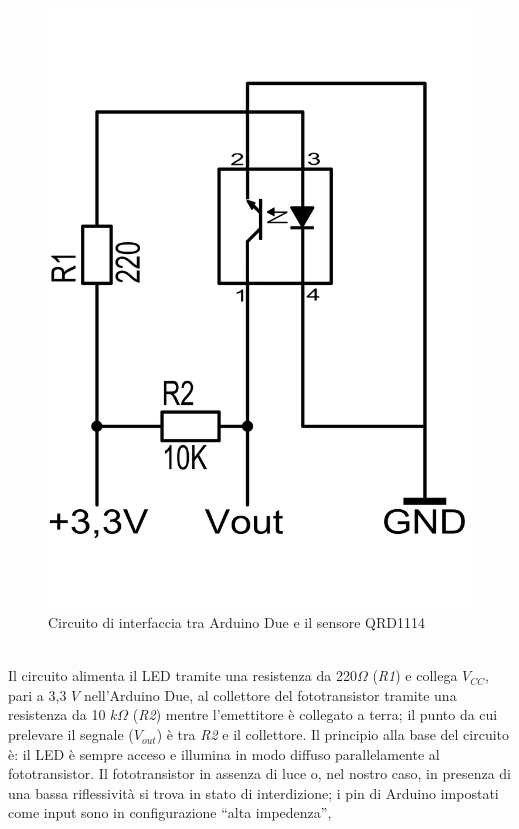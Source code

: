 \begin{figure}[!htb] \center
\includegraphics[scale=0.3]{immagini/QRD1114_Circuito.png}
\caption{Circuito di interfaccia tra Arduino Due e il sensore QRD1114} 
\end{figure}
\\Il circuito alimenta il LED tramite una resistenza da 220$\Omega$ (\textit{R1}) 
e collega $V_{CC}$, pari a 3,3 $V$ nell'Arduino Due, al collettore del 
fototransistor tramite una resistenza da 10 $k\Omega$ (\textit{R2}) mentre 
l'emettitore è collegato a terra; il punto da cui prelevare il segnale ($V_{out
}$) è tra \textit{R2} e il collettore. Il principio alla base del circuito è: 
il LED è sempre acceso e illumina in modo diffuso parallelamente al 
fototransistor. Il fototransistor in assenza di luce o, nel nostro caso, in 
presenza di una bassa riflessività si trova in stato di interdizione; i pin di 
Arduino impostati come input sono in configurazione ``alta impedenza'', 
